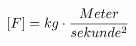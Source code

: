 \documentclass[preview]{standalone}
\begin{document}
\begin{align*}
\special{dvisvgm:raw <g id='unique000'>}[F] = kg \cdot \frac{Meter}{sekunde^{2}}\special{dvisvgm:raw </g>}
\end{align*}
\end{document}
